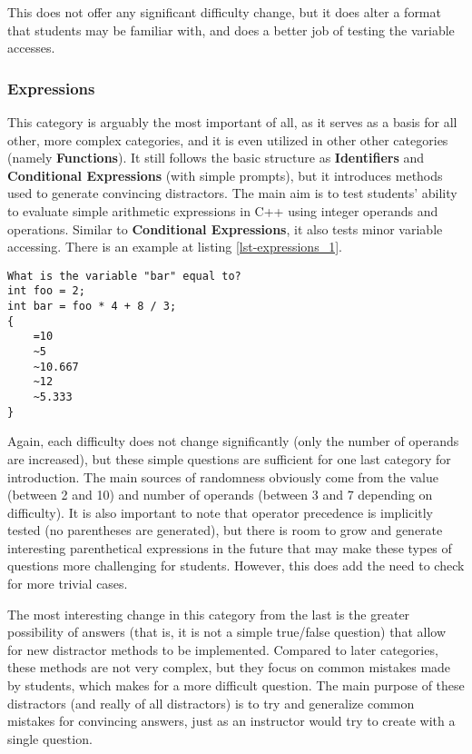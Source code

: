 \documentclass{article}
\begin{document}
This does not offer any significant difficulty change, but it does alter a format that students may be familiar with, and does a better job of testing the variable accesses.

\subsubsection{Expressions} \label{subsubsec-expressions}
This category is arguably the most important of all, as it serves as a basis for all other, more complex categories, and it is even utilized in other other categories
(namely \textbf{Functions}). It still follows the basic structure as \textbf{Identifiers} and \textbf{Conditional Expressions} (with simple prompts), but it introduces methods used to generate convincing distractors.
The main aim is to test students' ability to evaluate simple arithmetic expressions in C++ using integer operands and operations. Similar to \textbf{Conditional Expressions}, it also
tests minor variable accessing. There is an example at listing \ref{lst-expressions_1}.

\begin{lstlisting}[caption={Expressions Question in GIFT}, label=lst-expressions_1]
What is the variable "bar" equal to? 
int foo = 2; 
int bar = foo * 4 + 8 / 3;
{
	=10
	~5
	~10.667
	~12
	~5.333
}
\end{lstlisting}


Again, each difficulty does not change significantly (only the number of operands are increased), but these simple questions are sufficient for one last category for introduction.
The main sources of randomness obviously come from the value (between 2 and 10) and number of operands (between 3 and 7 depending on difficulty). It is also important to note that
operator precedence is implicitly tested (no parentheses are generated), but there is room to grow and generate interesting parenthetical expressions in the future that may make
these types of questions more challenging for students. However, this does add the need to check for more trivial cases. 

The most interesting change in this category from the last is the greater possibility of answers (that is, it is not a simple true/false question) that allow for new distractor methods to be implemented. Compared to later categories, these methods are not very complex, but they focus on common mistakes made by students, which makes for a more difficult question. The main
purpose of these distractors (and really of all distractors) is to try and generalize common mistakes for convincing answers, just as an instructor would try to create with a single question. 
\end{document}
